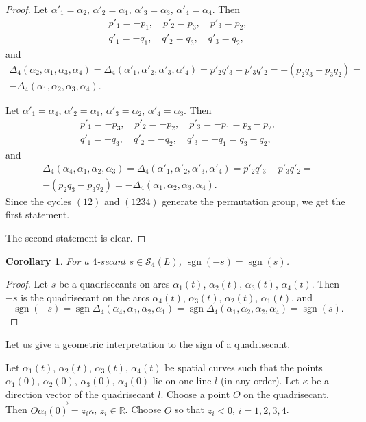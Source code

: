 \documentclass{article}
\newtheorem{corollary}{Corollary}
\theoremstyle{definition}
\theoremstyle{remark}
\def\R{{\mathbb R}}
\DeclareMathOperator{\sgn}{\mathrm{sgn}}
\begin{document}
\begin{proof}
Let $\alpha'_1=\alpha_2$, $\alpha'_2=\alpha_1$, $\alpha'_3=\alpha_3$, $\alpha'_4=\alpha_4$. Then
\begin{gather*}
    p'_1=-p_1,\quad p'_2=p_3,\quad p'_3=p_2,\\
    q'_1=-q_1,\quad q'_2=q_3,\quad q'_3=q_2,
\end{gather*}
and
\begin{multline*}
\Delta_4(\alpha_2,\alpha_1,\alpha_3,\alpha_4)=\Delta_4(\alpha'_1,\alpha'_2,\alpha'_3,\alpha'_4)=p'_2q'_3-p'_3q'_2=-(p_2q_3-p_3q_2)=\\ -\Delta_4(\alpha_1,\alpha_2,\alpha_3,\alpha_4).
\end{multline*}

Let $\alpha'_1=\alpha_4$, $\alpha'_2=\alpha_1$, $\alpha'_3=\alpha_2$, $\alpha'_4=\alpha_3$. Then
\begin{gather*}
    p'_1=-p_3,\quad p'_2=-p_2,\quad p'_3=-p_1=p_3-p_2,\\
    q'_1=-q_3,\quad q'_2=-q_2,\quad q'_3=-q_1=q_3-q_2,
\end{gather*}
and
\begin{multline*}
\Delta_4(\alpha_4,\alpha_1,\alpha_2,\alpha_3)=\Delta_4(\alpha'_1,\alpha'_2,\alpha'_3,\alpha'_4)=p'_2q'_3-p'_3q'_2=\\  %
-(p_2q_3-p_3q_2)= -\Delta_4(\alpha_1,\alpha_2,\alpha_3,\alpha_4).
\end{multline*}
Since the cycles $(12)$ and $(1234)$ generate the permutation group, we get the first statement.

The second statement is clear.
\end{proof}

\begin{corollary}\label{cor:4secant_inverse_sign}
    For a $4$-secant $s\in\mathcal S_4(L)$, $\sgn(-s)=\sgn(s)$.
\end{corollary}
\begin{proof}
    Let $s$ be a quadrisecants on arcs $\alpha_1(t)$, $\alpha_2(t)$, $\alpha_3(t)$, $\alpha_4(t)$. Then $-s$ is the quadrisecant on the arcs $\alpha_4(t)$, $\alpha_3(t)$, $\alpha_2(t)$, $\alpha_1(t)$, and
\[
\sgn(-s)=\sgn\Delta_4(\alpha_4,\alpha_3,\alpha_2,\alpha_1)=\sgn\Delta_4(\alpha_1,\alpha_2,\alpha_2,\alpha_4)=\sgn(s).
\]
\end{proof}

Let us give a geometric interpretation to the sign of a quadrisecant.

Let $\alpha_1(t)$, $\alpha_2(t)$, $\alpha_3(t)$, $\alpha_4(t)$ be spatial curves such that the points $\alpha_1(0)$, $\alpha_2(0)$, $\alpha_3(0)$, $\alpha_4(0)$ lie on one line $l$ (in any order). Let $\kappa$ be a direction vector of the quadrisecant $l$. Choose a point $O$ on the quadrisecant. Then $\overrightarrow{O\alpha_i(0)}=z_i\kappa$, $z_i\in\R$. Choose $O$ so that $z_i<0$, $i=1,2,3,4$.
\end{document}

